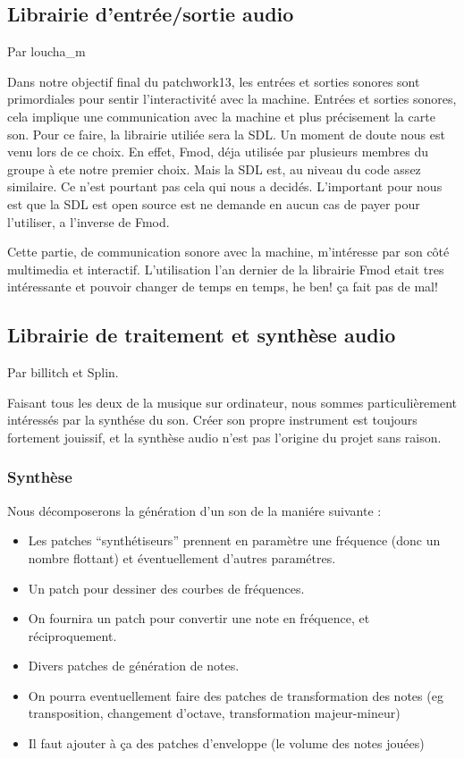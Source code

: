 \documentclass[14pt,a4paper]{article}
\begin{document}
\subsection{Librairie d'entr\'ee/sortie audio}
\par
Par loucha\_m
\\
\par
Dans notre objectif final du patchwork13, les entr\'ees et sorties
 sonores sont primordiales pour sentir l'interactivit\'e avec la machine.
Entr\'ees et sorties sonores, cela implique une communication
 avec la machine et plus pr\'ecisement la carte son.
 Pour ce faire, la librairie utili\'ee sera la SDL.
Un moment de doute nous est venu lors de ce choix. En effet, Fmod, d\'eja
 utilis\'ee par plusieurs membres du groupe \`a ete notre premier choix.
 Mais la SDL est, au niveau du code assez similaire.
 Ce n'est pourtant pas cela qui nous a decid\'es. L'important pour nous
 est que la SDL est open source est ne demande en aucun cas de payer
 pour l'utiliser, a l'inverse de Fmod.\\
\par
Cette partie, de communication sonore avec la machine, m'int\'eresse par
 son c\^ot\'e multimedia et interactif. L'utilisation l'an dernier de
 la librairie Fmod etait tres int\'eressante et pouvoir changer de temps
 en temps, he ben! \c{c}a fait pas de mal!


\subsection{Librairie de traitement et synth\`ese audio}
Par billitch et Splin.
\\
\par
Faisant tous les deux de la musique sur ordinateur, nous sommes particuli\`erement
int\'eress\'es par la synth\'ese du son.
Cr\'eer son propre instrument est toujours fortement jouissif, et
la synth\`ese audio n'est pas l'origine du projet sans raison.

\subsubsection{Synth\`ese}
Nous d\'ecomposerons la g\'en\'eration d'un son de la mani\'ere suivante :
\begin{itemize}
\item Les patches ``synth\'etiseurs'' prennent en param\`etre une fr\'equence
(donc un nombre flottant) et \'eventuellement d'autres param\'etres.
\item Un patch pour dessiner des courbes de fr\'equences.
\item On fournira un patch pour convertir une note en fr\'equence,
 et r\'eciproquement.
\item Divers patches de g\'en\'eration de notes.
\item On pourra eventuellement faire des patches de transformation des notes
 (eg transposition, changement d'octave, transformation majeur-mineur)
\item Il faut ajouter \`a \c{c}a des patches d'enveloppe (le volume des
 notes jou\'ees)
\end{itemize}
\end{document}
